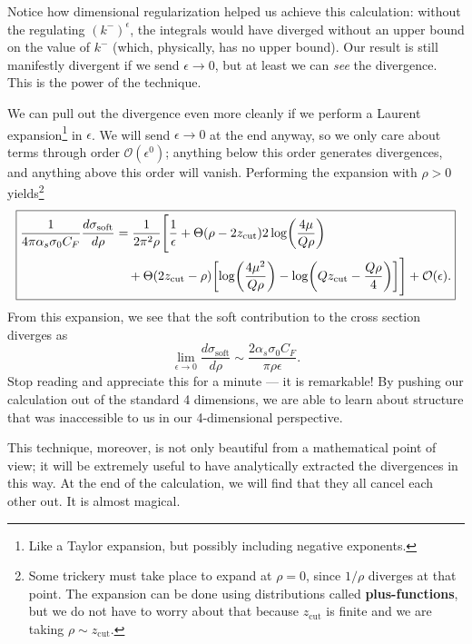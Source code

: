 \documentclass[../thesis.tex]{subfiles}
\providecommand{\zcut}{z_\mathrm{{cut}}}
\providecommand{\cO}{\mathcal{O}}
\begin{document}
	Notice how dimensional regularization helped us achieve this calculation: without the regulating $(k^-)^\epsilon$, the integrals would have diverged without an upper bound on the value of $k^-$ (which, physically, has no upper bound). Our result is still manifestly divergent if we send $\epsilon \to 0$, but at least we can \textit{see} the divergence. This is the power of the technique.

	We can pull out the divergence even more cleanly if we perform a Laurent expansion\footnote{Like a Taylor expansion, but possibly including negative exponents.} in $\epsilon$. We will send $\epsilon \to 0$ at the end anyway, so we only care about terms through order $\cO(\epsilon^0)$; anything below this order generates divergences, and anything above this order will vanish. Performing the expansion with $\rho > 0$ yields\footnote{Some trickery must take place to expand at $\rho = 0$, since $1/\rho$ diverges at that point. The expansion can be done using distributions called \textbf{plus-functions}, but we do not have to worry about that because $\zcut$ is finite and we are taking $\rho \sim \zcut$.}
	\begin{equation}\label{leading-eq:soft result}
	\boxed{
	\begin{aligned}
		\frac{1}{4\pi\alpha_s\sigma_0 C_F}\frac{d\sigma_{\text{soft}}}{d\rho} &= \frac{1}{2\pi^2\rho} \Bigg[\frac{1}{\epsilon} + \Theta(\rho - 2\zcut)2\log(\frac{4\mu}{Q\rho}) \\
			&\quad+ \Theta(2\zcut - \rho)\qty[\log(\frac{4\mu^2}{Q \rho}) - \log(Q \zcut - \frac{Q\rho}{4})]\Bigg] + \cO(\epsilon).
	\end{aligned}
	}
	\end{equation}
	From this expansion, we see that the soft contribution to the cross section diverges as
	\begin{equation}
		\lim_{\epsilon \to 0}\frac{d\sigma_\text{soft}}{d\rho} \sim \frac{2\alpha_s \sigma_0 C_F}{\pi\rho \epsilon}.
	\end{equation}
	Stop reading and appreciate this for a minute --- it is remarkable! By pushing our calculation out of the standard 4 dimensions, we are able to learn about structure that was inaccessible to us in our 4-dimensional perspective. 

	This technique, moreover, is not only beautiful from a mathematical point of view; it will be extremely useful to have analytically extracted the divergences in this way. At the end of the calculation, we will find that they all cancel each other out. It is almost magical.
\end{document}
